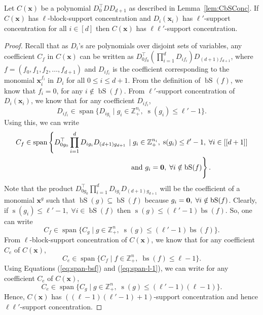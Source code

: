 \documentclass[final,oneeqnum, onethmnum, onefignum]{siamltex1213}
\newcommand{\Zp}{\mathbb{Z}_+}
\DeclareMathOperator{\Span}{span}
\DeclareMathOperator{\suppo}{s} %
\DeclareMathOperator{\bs}{bs}
\DeclareMathOperator{\bS}{bS}
\newcommand{\x}{\mathbf{x}}
\begin{document}
\begin{lemma}[Composition]
Let $C(\x)$ be a polynomial $D_0^{\top} D  D_{d+1}$
as described in Lemma~\ref{lem:CbSConc}. 
If $C(\x)$ has $\ell$-block-support concentration and
$D_i(\mathbf{x}_i)$ has $\ell'$-support concentration for all $i \in [d]$ then 
$C(\x)$ has $\ell \ell'$-support concentration.  
\label{lem:ll'}
\end{lemma}
\begin{proof}
Recall that as $D_i$'s are polynomials over disjoint sets of variables,
any coefficient $C_f$ in $C(\x)$ can be written as
$D_{0 f_0}^{\top} (\prod_{i=1}^d D_{if_i}) D_{(d+1)f_{d+1}}$, 
where $f = (f_0, f_1, f_2, \dots, f_{d+1})$ and
$D_{if_i}$ is the coefficient corresponding to the monomial $\mathbf{x}_i^{f_i}$
in $D_i$ for all $0 \leq i \leq d+1$.
From the definition of $\bS(f)$, we know that
$f_i = 0$, for any $i \notin \bS(f)$.
From $\ell'$-support concentration of $D_i(\mathbf{x}_i)$, 
we know that for any coefficient $D_{if_i}$,
$$D_{if_i} \in \Span \{D_{ig_i} \mid g_i \in \Zp^{n_i}, \; \suppo(g_i) \leq \ell'-1 \}.$$
Using this, we can write
\begin{equation}
\begin{split}
C_f \in \Span \left\{ D_{0g_0}^{\top} \prod_{i = 1}^d D_{ig_i} D_{(d+1)g_{d+1}} \right. & \mid  
 g_i \in \Zp^{n_i}, \; \suppo(g_i) \leq \ell'-1, \; \forall i \in [[d+1]]  \\ 
& \left. \text{ and } g_i={\bf 0}, \; \forall i \notin \bS(f) \vphantom{\prod_{i = 1}^d} \right\} .
\end{split}
\end{equation}
Note that the product $D_{0g_0}^{\top} \prod_{i = 1}^d D_{ig_i} D_{(d+1)g_{d+1}}$ 
will be the coefficient of a monomial $\mathbf{x}^g$ such that $\bS(g) \subseteq \bS(f)$
because $g_i={\bf 0}, \; \forall i \notin \bS(f)$.
Clearly, if $\suppo(g_i) \leq \ell'-1, \; \forall i \in \bS(f)$ then $\suppo(g) \leq (\ell'-1)\bs(f)$.
So, one can write
\begin{equation}
C_f \in \Span\{ C_g \mid g \in \Zp^n, \; \suppo(g) \leq (\ell'-1)\bs(f)  \} .
\label{eq:span-bsf}
\end{equation}
From $\ell$-block-support concentration of $C(\x)$,
 we know that for any 
coefficient $C_e$ of $C(\x)$, 
\begin{equation}
C_e \in \Span\{ C_f \mid f \in \Zp^n, \; \bs(f) \leq \ell - 1 \}.
\label{eq:span-l-1}
\end{equation}
Using Equations (\ref{eq:span-bsf}) and (\ref{eq:span-l-1}),
we can write for any 
coefficient $C_e$ of $C(\x)$, 
$$C_e \in \Span\{ C_g \mid g \in \Zp^n, \; \suppo(g) \leq (\ell'-1)(\ell - 1) \}.$$
Hence, $C(\x)$ has $((\ell - 1)(\ell'-1)+1)$-support concentration and
hence $\ell \ell'$-support concentration.
\end{proof}
\end{document}
